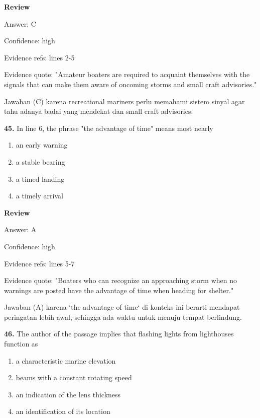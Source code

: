 \documentclass[12pt]{article}
\begin{document}
\par
\begingroup
\setlength{\parskip}{0pt}
\setlength{\parindent}{0pt}
\textbf{Review}\par
Answer: C\par
Confidence: high\par
Evidence refs: lines 2-5\par
Evidence quote: "Amateur boaters are required to acquaint themselves with the signals that can make them aware of oncoming storms and small craft advisories."\par
Jawaban (C) karena recreational mariners perlu memahami sistem sinyal agar tahu adanya badai yang mendekat dan small craft advisories.\par
\endgroup
\par
\vspace{0.25\baselineskip}
\noindent\textbf{45.} In line 6, the phrase "the advantage of time" means most nearly
\begin{enumerate}[label=(\Alph*),leftmargin=*,itemsep=0.2em]
\item an early warning
\item a stable bearing
\item a timed landing
\item a timely arrival
\end{enumerate}
\par
\begingroup
\setlength{\parskip}{0pt}
\setlength{\parindent}{0pt}
\textbf{Review}\par
Answer: A\par
Confidence: high\par
Evidence refs: lines 5-7\par
Evidence quote: "Boaters who can recognize an approaching storm when no warnings are posted have the advantage of time when heading for shelter."\par
Jawaban (A) karena `the advantage of time` di konteks ini berarti mendapat peringatan lebih awal, sehingga ada waktu untuk menuju tempat berlindung.\par
\endgroup
\par
\vspace{0.25\baselineskip}
\noindent\textbf{46.} The author of the passage implies that flashing lights from lighthouses function as
\begin{enumerate}[label=(\Alph*),leftmargin=*,itemsep=0.2em]
\item a characteristic marine elevation
\item beams with a constant rotating speed
\item an indication of the lens thickness
\item an identification of its location
\end{enumerate}
\end{document}
